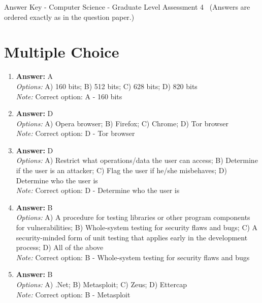 \documentclass[12pt]{article}
\begin{document}
\begin{center}
Answer Key - Computer Science - Graduate Level Assessment 4 \
\small (Answers are ordered exactly as in the question paper.)
\end{center}

\section*{Multiple Choice}
\begin{enumerate}[label=\arabic*.]
\item \textbf{Answer:} A
\\ \textit{Options:} A) 160 bits; B) 512 bits; C) 628 bits; D) 820 bits
\\ \textit{Note:} Correct option: A - 160 bits
\item \textbf{Answer:} D
\\ \textit{Options:} A) Opera browser; B) Firefox; C) Chrome; D) Tor browser
\\ \textit{Note:} Correct option: D - Tor browser
\item \textbf{Answer:} D
\\ \textit{Options:} A) Restrict what operations/data the user can access; B) Determine if the user is an attacker; C) Flag the user if he/she misbehaves; D) Determine who the user is
\\ \textit{Note:} Correct option: D - Determine who the user is
\item \textbf{Answer:} B
\\ \textit{Options:} A) A procedure for testing libraries or other program components for vulnerabilities; B) Whole-system testing for security flaws and bugs; C) A security-minded form of unit testing that applies early in the development process; D) All of the above
\\ \textit{Note:} Correct option: B - Whole-system testing for security flaws and bugs
\item \textbf{Answer:} B
\\ \textit{Options:} A) .Net; B) Metasploit; C) Zeus; D) Ettercap
\\ \textit{Note:} Correct option: B - Metasploit
\end{enumerate}
\end{document}

